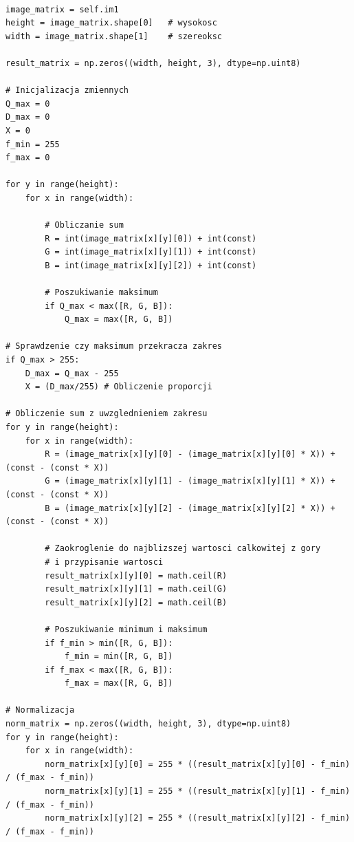 \documentclass[final,a4paper,openany,12pt]{mwbk}
\begin{document}
\begin{lstlisting}[caption=Sumowanie obrazu barwowego ze stałą]

image_matrix = self.im1
height = image_matrix.shape[0]   # wysokosc
width = image_matrix.shape[1]    # szereoksc

result_matrix = np.zeros((width, height, 3), dtype=np.uint8)

# Inicjalizacja zmiennych
Q_max = 0
D_max = 0
X = 0
f_min = 255
f_max = 0

for y in range(height):
    for x in range(width):  

        # Obliczanie sum
        R = int(image_matrix[x][y][0]) + int(const)
        G = int(image_matrix[x][y][1]) + int(const)
        B = int(image_matrix[x][y][2]) + int(const)

        # Poszukiwanie maksimum               
        if Q_max < max([R, G, B]):
            Q_max = max([R, G, B])

# Sprawdzenie czy maksimum przekracza zakres
if Q_max > 255:
    D_max = Q_max - 255
    X = (D_max/255) # Obliczenie proporcji

# Obliczenie sum z uwzglednieniem zakresu
for y in range(height):
    for x in range(width): 
        R = (image_matrix[x][y][0] - (image_matrix[x][y][0] * X)) + (const - (const * X))
        G = (image_matrix[x][y][1] - (image_matrix[x][y][1] * X)) + (const - (const * X))
        B = (image_matrix[x][y][2] - (image_matrix[x][y][2] * X)) + (const - (const * X))

        # Zaokroglenie do najblizszej wartosci calkowitej z gory
        # i przypisanie wartosci
        result_matrix[x][y][0] = math.ceil(R)
        result_matrix[x][y][1] = math.ceil(G)
        result_matrix[x][y][2] = math.ceil(B)

        # Poszukiwanie minimum i maksimum                
        if f_min > min([R, G, B]):
            f_min = min([R, G, B])
        if f_max < max([R, G, B]):
            f_max = max([R, G, B])

# Normalizacja
norm_matrix = np.zeros((width, height, 3), dtype=np.uint8)
for y in range(height):
    for x in range(width):
        norm_matrix[x][y][0] = 255 * ((result_matrix[x][y][0] - f_min) / (f_max - f_min))
        norm_matrix[x][y][1] = 255 * ((result_matrix[x][y][1] - f_min) / (f_max - f_min))
        norm_matrix[x][y][2] = 255 * ((result_matrix[x][y][2] - f_min) / (f_max - f_min))

\end{lstlisting}
\newpage
\end{document}
